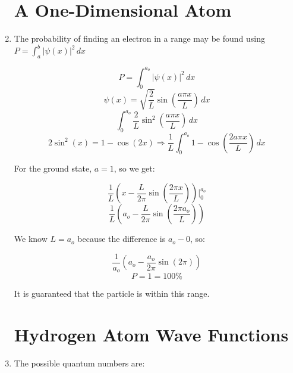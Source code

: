 \begin{enumerate}

    \section*{A One-Dimensional Atom}

  \item The probability of finding an electron in a range may be found using $P=\displaystyle\int_a^b|\psi(x)|^2\,dx$

    $$P=\int_0^{a_o} |\psi(x)|^2\,dx$$
    $$\psi(x)=\sqrt{\frac{2}{L}}\sin\left( \frac{a\pi x}{L} \right)\,dx$$
    $$\int_0^{a_o} \frac{2}{L}\sin^2\left( \frac{a\pi x}{L} \right)\, dx$$
    $$2\sin^2(x)=1-\cos(2x)\Rightarrow\frac{1}{L}\int_0^{a_o} 1-\cos\left( \frac{2a\pi x}{L} \right)\,dx$$

    For the ground state, $a=1$, so we get:

    $$\frac{1}{L}\left( x-\frac{L}{2\pi}\sin\left( \frac{2\pi x}{L} \right) \right)\Big|_0^{a_o}$$
    $$\frac{1}{L}\left( a_o-\frac{L}{2\pi}\sin\left(\frac{2\pi a_o}{L}\right) \right)$$

    We know $L=a_o$ because the difference is $a_o-0$, so:

    $$\frac{1}{a_o}\left( a_o-\frac{a_o}{2\pi}\sin(2\pi) \right)$$
    $$P=1=100\%$$

    It is guaranteed that the particle is within this range.

    \section*{Hydrogen Atom Wave Functions}

  \item The possible quantum numbers are:


\end{enumerate}
